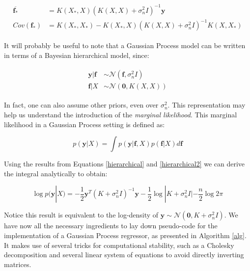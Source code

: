 \documentclass[10pt,a4paper,twoside]{book}
\begin{document}
\begin{align}
\begin{split}
\boldsymbol{\overline{f_*}} &= K(X_*, X)\left(K(X, X) + \sigma^2_n I   \right)^{-1}\boldsymbol{y}\\
Cov(\boldsymbol{f_*}) &= K(X_*, X_*) - K(X_*, X)\left(K(X, X) + \sigma_n^2 I \right)^{-1}K(X, X_*)
\end{split}
\end{align}

It will probably be useful to note that a Gaussian Process model can be written in terms of a Bayesian hierarchical model, since:

\begin{align}
\begin{split}
\label{hierarchical}
\boldsymbol{y}|\boldsymbol{f} &\sim \mathcal{N}(\boldsymbol{f}, \sigma^2_n I)\\
\boldsymbol{f}|X &\sim \mathcal{N}(\boldsymbol{0}, K(X, X))
\end{split}
\end{align}

In fact, one can also assume other priors, even over $\sigma_n^2$. This representation may help us understand the introduction of the \textit{marginal likelihood}. This marginal likelihood in a Gaussian Process setting is defined as:

\begin{equation}\label{marglike}
p(\boldsymbol{y}|X) = \int p(\boldsymbol{y}|\boldsymbol{f}, X)p(\boldsymbol{f}|X) d\boldsymbol{f}
\end{equation}

Using the results from Equations \ref{hierarchical} and \ref{hierarchical2} we can derive the integral analytically to obtain:

\begin{equation}
\log p(\boldsymbol{y}|X) = - \dfrac{1}{2}\boldsymbol{y}^T(K + \sigma^2_n I)^{-1}\boldsymbol{y} - \dfrac{1}{2}\log |K + \sigma^2_n I| - \dfrac{n}{2}\log 2\pi
\end{equation}

Notice this result is equivalent to the log-density of $\boldsymbol{y} \sim \mathcal{N}(\boldsymbol{0}, K + \sigma_n^2 I)$. We have now all the necessary ingredients to lay down pseudo-code for the implementation of a Gaussian Process regressor, as presented in Algorithm \ref{alg}. It makes use of several tricks for computational stability, such as a Cholesky decomposition and several linear system of equations to avoid directly inverting matrices.\\
\end{document}
